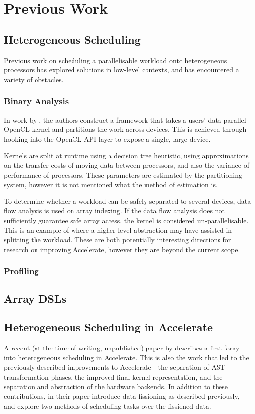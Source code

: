 \documentclass[a4paper,12pt]{article}
\begin{document}
\section{Previous Work}

\subsection{Heterogeneous Scheduling}
Previous work on scheduling a parallelisable workload onto heterogeneous processors has explored solutions in low-level contexts, and has encountered a variety of obstacles.

\subsubsection*{Binary Analysis}
In work by \citet*{lee_transparent_2013}, the authors construct a framework that takes a users' data parallel OpenCL kernel and partitions the work across devices.
This is achieved through hooking into the OpenCL API layer to expose a single, large device.

Kernels are split at runtime using a decision tree heuristic, using approximations on the transfer costs of moving data between processors, and also the variance of performance of processors.
These parameters are estimated by the partitioning system, however it is not mentioned what the method of estimation is.

To determine whether a workload can be safely separated to several devices, data flow analysis is used on array indexing.
If the data flow analysis does not sufficiently guarantee safe array access, the kernel is considered un-parallelisable.
This is an example of where a higher-level abstraction may have assisted in splitting the workload.
These are both potentially interesting directions for research on improving Accelerate, however they are beyond the current scope.

\subsubsection*{Profiling}


\subsection{Array DSLs}

\subsection{Heterogeneous Scheduling in Accelerate}
A recent (at the time of writing, unpublished) paper by \citet*{newton_converting_2014} describes a first foray into heterogeneous scheduling in Accelerate.
This is also the work that led to the previously described improvements to Accelerate - the separation of AST transformation phases, the improved final kernel representation, and the separation and abstraction of the hardware backends. 
In addition to these contributions, in their paper  \citeauthor{newton_converting_2014} introduce data fissioning as described previously, and explore two methods of scheduling tasks over the fissioned data.
\end{document}
